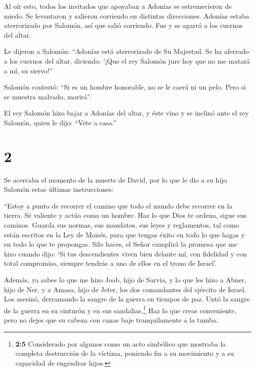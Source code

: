  Al oír esto, todos los invitados que apoyaban a Adonías se
estremecieron de miedo. Se levantaron y salieron corriendo en distintas
direcciones.  Adonías estaba aterrorizado por Salomón, así
que salió corriendo. Fue y se agarró a los cuernos del altar.

 Le dijeron a Salomón: ``Adonías está aterrorizado de Su
Majestad. Se ha aferrado a los cuernos del altar, diciendo: '¡Que el rey
Salomón jure hoy que no me matará a mí, su siervo!''

 Salomón contestó: ``Si es un hombre honorable, no se le
caerá ni un pelo. Pero si se muestra malvado, morirá''.

 El rey Salomón hizo bajar a Adonías del altar, y éste vino
y se inclinó ante el rey Salomón, quien le dijo: ``Vete a casa.''

\hypertarget{section-1}{%
\section{2}\label{section-1}}

 Se acercaba el momento de la muerte de David, por lo que le
dio a su hijo Salomón estas últimas instrucciones:

 ``Estoy a punto de recorrer el camino que todo el mundo
debe recorrer en la tierra. Sé valiente y actúa como un hombre.
 Haz lo que Dios te ordena, sigue sus caminos. Guarda sus
normas, sus mandatos, sus leyes y reglamentos, tal como están escritos
en la Ley de Moisés, para que tengas éxito en todo lo que hagas y en
todo lo que te propongas.  Silo haces, el Señor cumplirá la
promesa que me hizo cuando dijo: `Si tus descendientes viven bien
delante mí, con fidelidad y con total compromiso, siempre tendrás a uno
de ellos en el trono de Israel'.

 Además, ya sabes lo que me hizo Joab, hijo de Sarvia, y lo
que les hizo a Abner, hijo de Ner, y a Amasa, hijo de Jeter, los dos
comandantes del ejército de Israel. Los asesinó, derramando la sangre de
la guerra en tiempos de paz. Untó la sangre de la guerra en su cinturón
y en sus sandalias.\footnote{\textbf{2:5} Considerado por algunos como
  un acto simbólico que mostraba la completa destrucción de la víctima,
  poniendo fin a su movimiento y a su capacidad de engendrar hijos.}
 Haz lo que creas conveniente, pero no dejes que su cabeza
con canas baje tranquilamente a la tumba.

